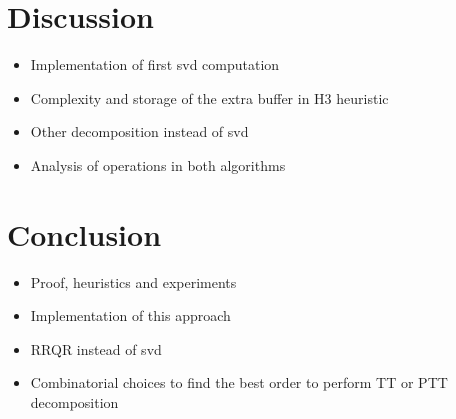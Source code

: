 \documentclass[runningheads]{llncs}
\begin{document}
\section{Discussion}
\label{sec:discussion}
\begin{itemize}
	\item Implementation of first svd computation
	\item Complexity and storage of the extra buffer in H3 heuristic
	\item Other decomposition instead of svd
	\item Analysis of operations in both algorithms
\end{itemize}

\section{Conclusion}
\label{sec:conclusion}
\begin{itemize}
	\item Proof, heuristics and experiments
	\item Implementation of this approach
	\item RRQR instead of svd
	\item Combinatorial choices to find the best order to perform TT or PTT decomposition
\end{itemize}

%
%
%
 
 
\end{document}
